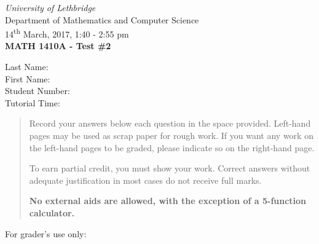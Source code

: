 \documentclass[12pt]{article}
\newcommand{\skipline}{\vspace{12pt}}
\begin{document}
\author{Instructor: Sean Fitzpatrick}
\thispagestyle{plain}
\begin{center}
\emph{University of Lethbridge}\\
Department of Mathematics and Computer Science\\
14\textsuperscript{th} March, 2017, 1:40 - 2:55 pm\\
{\bf MATH 1410A - Test \#2}\\
\end{center}
\skipline \skipline \skipline \noindent \skipline
Last Name:\underline{\hspace{353pt}}\\
\skipline
First Name:\underline{\hspace{350pt}}\\
\skipline
Student Number:\underline{\hspace{323pt}}\\
\skipline
Tutorial Time: \underline{\hspace{320pt}}\\


\vspace{0.5in}


\begin{quote}
  Record your answers below each question in the space provided.    Left-hand pages may be used as scrap paper for rough work.  If you want any work on the left-hand pages to be graded, please indicate so on the right-hand page.
 
 \bigskip
 
To earn partial credit, you must show your work. Correct answers without adequate justification in most cases do not receive full marks.

\bigskip

{\bf No external aids are allowed, with the exception of a 5-function calculator.}
\end{quote}


\vspace{0.5in}

For grader's use only:
\end{document}
